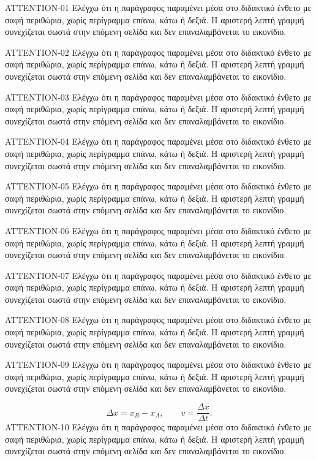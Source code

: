 \begin{AttentionBox}
ATTENTION-01 Ελέγχω ότι η παράγραφος παραμένει μέσα στο διδακτικό ένθετο με σαφή περιθώρια, χωρίς περίγραμμα επάνω, κάτω ή δεξιά. Η αριστερή λεπτή γραμμή συνεχίζεται σωστά στην επόμενη σελίδα και δεν επαναλαμβάνεται το εικονίδιο.\par
ATTENTION-02 Ελέγχω ότι η παράγραφος παραμένει μέσα στο διδακτικό ένθετο με σαφή περιθώρια, χωρίς περίγραμμα επάνω, κάτω ή δεξιά. Η αριστερή λεπτή γραμμή συνεχίζεται σωστά στην επόμενη σελίδα και δεν επαναλαμβάνεται το εικονίδιο.\par
ATTENTION-03 Ελέγχω ότι η παράγραφος παραμένει μέσα στο διδακτικό ένθετο με σαφή περιθώρια, χωρίς περίγραμμα επάνω, κάτω ή δεξιά. Η αριστερή λεπτή γραμμή συνεχίζεται σωστά στην επόμενη σελίδα και δεν επαναλαμβάνεται το εικονίδιο.\par
ATTENTION-04 Ελέγχω ότι η παράγραφος παραμένει μέσα στο διδακτικό ένθετο με σαφή περιθώρια, χωρίς περίγραμμα επάνω, κάτω ή δεξιά. Η αριστερή λεπτή γραμμή συνεχίζεται σωστά στην επόμενη σελίδα και δεν επαναλαμβάνεται το εικονίδιο.\par
ATTENTION-05 Ελέγχω ότι η παράγραφος παραμένει μέσα στο διδακτικό ένθετο με σαφή περιθώρια, χωρίς περίγραμμα επάνω, κάτω ή δεξιά. Η αριστερή λεπτή γραμμή συνεχίζεται σωστά στην επόμενη σελίδα και δεν επαναλαμβάνεται το εικονίδιο.\par
ATTENTION-06 Ελέγχω ότι η παράγραφος παραμένει μέσα στο διδακτικό ένθετο με σαφή περιθώρια, χωρίς περίγραμμα επάνω, κάτω ή δεξιά. Η αριστερή λεπτή γραμμή συνεχίζεται σωστά στην επόμενη σελίδα και δεν επαναλαμβάνεται το εικονίδιο.\par
ATTENTION-07 Ελέγχω ότι η παράγραφος παραμένει μέσα στο διδακτικό ένθετο με σαφή περιθώρια, χωρίς περίγραμμα επάνω, κάτω ή δεξιά. Η αριστερή λεπτή γραμμή συνεχίζεται σωστά στην επόμενη σελίδα και δεν επαναλαμβάνεται το εικονίδιο.\par
ATTENTION-08 Ελέγχω ότι η παράγραφος παραμένει μέσα στο διδακτικό ένθετο με σαφή περιθώρια, χωρίς περίγραμμα επάνω, κάτω ή δεξιά. Η αριστερή λεπτή γραμμή συνεχίζεται σωστά στην επόμενη σελίδα και δεν επαναλαμβάνεται το εικονίδιο.\par
ATTENTION-09 Ελέγχω ότι η παράγραφος παραμένει μέσα στο διδακτικό ένθετο με σαφή περιθώρια, χωρίς περίγραμμα επάνω, κάτω ή δεξιά. Η αριστερή λεπτή γραμμή συνεχίζεται σωστά στην επόμενη σελίδα και δεν επαναλαμβάνεται το εικονίδιο.\par
\[\Delta x=x_B-x_A,\qquad v=\frac{\Delta x}{\Delta t}.\]
ATTENTION-10 Ελέγχω ότι η παράγραφος παραμένει μέσα στο διδακτικό ένθετο με σαφή περιθώρια, χωρίς περίγραμμα επάνω, κάτω ή δεξιά. Η αριστερή λεπτή γραμμή συνεχίζεται σωστά στην επόμενη σελίδα και δεν επαναλαμβάνεται το εικονίδιο.\par

\end{AttentionBox}
